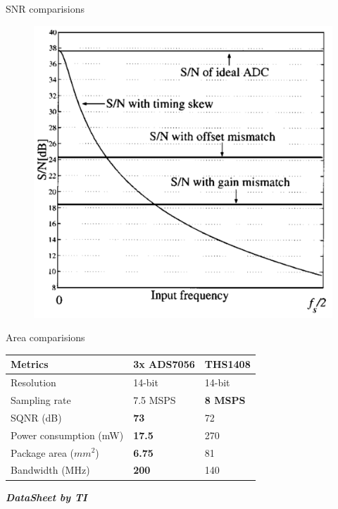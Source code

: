 \documentclass{beamer}
\begin{document}
\begin{frame}{SNR comparisions}
\begin{figure}
	\includegraphics[scale=0.25]{./figs/Over.png}
\end{figure}
\end{frame}

\begin{frame}{Area comparisions}
	\begin{table}[]
\begin{tabular}{|l|l|l|}
\hline
      Metrics                 & 3x ADS7056 & THS1408 \\
                       \hline
                       \hline
Resolution             & 14-bit     & 14-bit  \\
\hline
Sampling rate          & 7.5 MSPS   & \textbf{8 MSPS}  \\
\hline
SQNR (dB)              & \textbf{73}         & 72      \\
\hline
Power consumption (mW) & \textbf{17.5}       & 270    \\
\hline
Package	area ($mm^2$) & \textbf{6.75} & 81\\
\hline
Bandwidth (MHz) & \textbf{200} & 140\\
\hline
\end{tabular}
\end{table}
\textit{
\textbf{DataSheet by TI}}
\end{frame}
\end{document}
